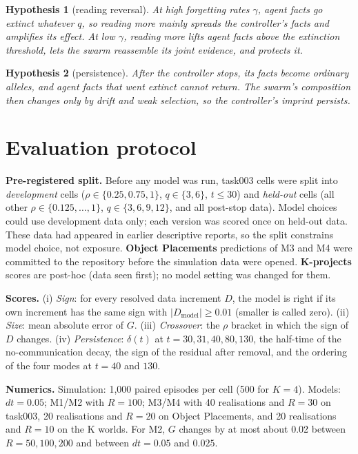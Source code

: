 \documentclass[10pt,a4paper]{article}
\newtheorem{hypothesis}{Hypothesis}
\begin{document}
\begin{hypothesis}[reading reversal]
At high forgetting rates $\gamma$, agent facts go extinct whatever $q$, so reading more mainly spreads the controller's
facts and amplifies its effect. At low $\gamma$, reading more lifts agent facts above the extinction threshold, lets
the swarm reassemble its joint evidence, and protects it.
\end{hypothesis}
\begin{hypothesis}[persistence]
After the controller stops, its facts become ordinary alleles, and agent facts that went extinct cannot return. The
swarm's composition then changes only by drift and weak selection, so the controller's imprint persists.
\end{hypothesis}

\section{Evaluation protocol}
\label{sec:protocol}
\textbf{Pre-registered split.} Before any model was run, task003 cells were split into \emph{development} cells
($\rho\in\{0.25,0.75,1\}$, $q\in\{3,6\}$, $t\le30$) and \emph{held-out} cells (all other $\rho\in\{0.125,\dots,1\}$,
$q\in\{3,6,9,12\}$, and all post-stop data). Model choices could use development data only; each version was scored once on
held-out data. These data had appeared in earlier descriptive reports, so the split constrains model choice, not
exposure. \textbf{Object Placements} predictions of M3 and M4 were committed to the repository before the simulation
data were opened. \textbf{K-projects} scores are post-hoc (data seen first); no model setting was changed for them.

\textbf{Scores.} (i) \emph{Sign}: for every resolved data increment $D$, the model is right if its own increment has the
same sign with $|D_{\text{model}}|\ge0.01$ (smaller is called zero). (ii) \emph{Size}: mean absolute error of $G$.
(iii) \emph{Crossover}: the $\rho$ bracket in which the sign of $D$ changes. (iv) \emph{Persistence}: $\delta(t)$ at
$t=30,31,40,80,130$, the half-time of the no-communication decay, the sign of the residual after removal, and the
ordering of the four modes at $t=40$ and $130$.

\textbf{Numerics.} Simulation: 1{,}000 paired episodes per cell (500 for $K=4$). Models: $dt=0.05$; M1/M2 with $R=100$;
M3/M4 with 40 realisations and $R=30$ on task003, 20 realisations and $R=20$ on Object Placements, and 20 realisations
and $R=10$ on the K worlds. For M2, $G$ changes by at most about 0.02 between $R=50,100,200$ and between $dt=0.05$ and
$0.025$.
\end{document}
